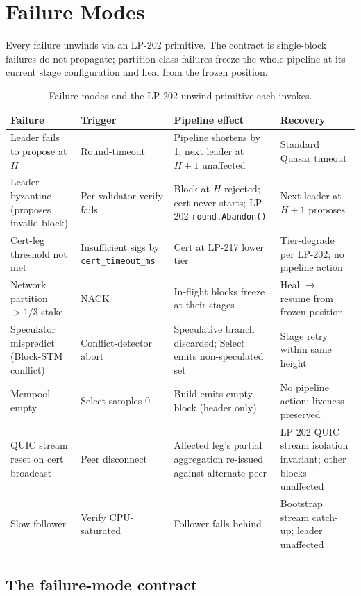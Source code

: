 \section{Failure Modes}

Every failure unwinds via an LP-202 primitive. The contract is
single-block failures do not propagate; partition-class failures
freeze the whole pipeline at its current stage configuration and
heal from the frozen position.

\begin{table}[h]
\centering
\small
\begin{tabular}{@{}p{4.5cm}p{3cm}p{4cm}p{3cm}@{}}
\toprule
\textbf{Failure} & \textbf{Trigger} & \textbf{Pipeline effect} & \textbf{Recovery} \\
\midrule
Leader fails to propose at $H$ & Round-timeout & Pipeline shortens by 1; next leader at $H{+}1$ unaffected & Standard Quasar timeout \\
Leader byzantine (proposes invalid block) & Per-validator verify fails & Block at $H$ rejected; cert never starts; LP-202 \texttt{round.Abandon()} & Next leader at $H{+}1$ proposes \\
Cert-leg threshold not met & Insufficient sigs by \texttt{cert\_timeout\_ms} & Cert at LP-217 lower tier & Tier-degrade per LP-202; no pipeline action \\
Network partition $>1/3$ stake & NACK & In-flight blocks freeze at their stages & Heal $\to$ resume from frozen position \\
Speculator mispredict (Block-STM conflict) & Conflict-detector abort & Speculative branch discarded; Select emits non-speculated set & Stage retry within same height \\
Mempool empty & Select samples 0 & Build emits empty block (header only) & No pipeline action; liveness preserved \\
QUIC stream reset on cert broadcast & Peer disconnect & Affected leg's partial aggregation re-issued against alternate peer & LP-202 QUIC stream isolation invariant; other blocks unaffected \\
Slow follower & Verify CPU-saturated & Follower falls behind & Bootstrap stream catch-up; leader unaffected \\
\bottomrule
\end{tabular}
\caption{Failure modes and the LP-202 unwind primitive each invokes.}
\label{tab:failures}
\end{table}

\subsection{The failure-mode contract}

